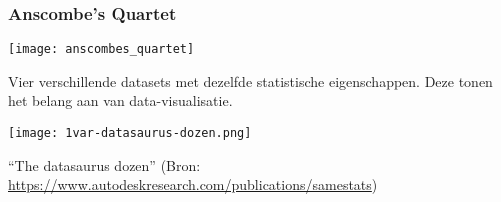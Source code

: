 \documentclass[aspectratio=169]{beamer}
\begin{document}
\begin{frame}
  \frametitle{Anscombe's Quartet}
  
  \centering
  \texttt{[image: anscombes\_quartet]}
  
  Vier verschillende datasets met dezelfde statistische eigenschappen. Deze tonen het belang aan van data-visualisatie.
\end{frame}

\begin{frame}[plain]
  \centering
  
  \texttt{[image: 1var-datasaurus-dozen.png]}
  
  ``The datasaurus dozen'' (Bron: \url{https://www.autodeskresearch.com/publications/samestats})
\end{frame}
\end{document}
